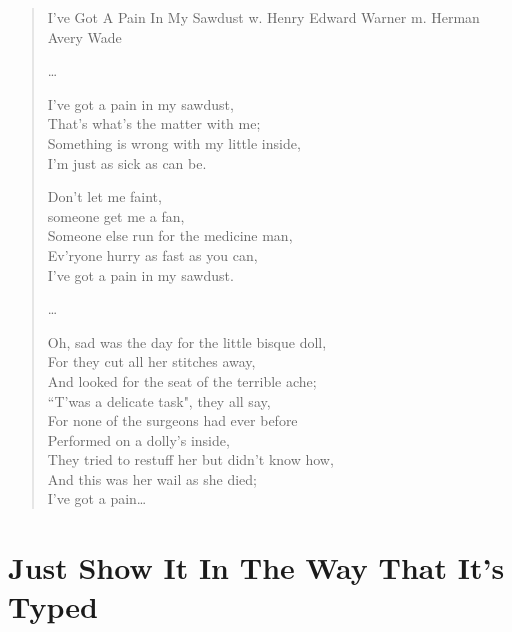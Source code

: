 \begin{verse}

\begin{center}

I've Got A Pain In My Sawdust
w. Henry Edward Warner m. Herman Avery Wade
\end{center}

\ldots

I've got a pain in my sawdust, \\

That's what's the matter with me;\\

Something is wrong with my little inside,\\

I'm just as sick as can be.

Don't let me faint, \\

someone get me a fan,\\

Someone else run for the medicine man,\\

Ev'ryone hurry as fast as you can,\\

I've got a pain in my sawdust.

\ldots

Oh, sad was the day for the little bisque doll,\\

For they cut all her stitches away,\\

And looked for the seat of the terrible ache;\\

``T'was a delicate task", they all say,\\

For none of the surgeons had ever before\\

Performed on a dolly's inside,\\

They tried to restuff her but didn't know how,\\

And this was her wail as she died;\\

I've got a pain\ldots
\end{verse}

\section{Just Show It In The Way That It's Typed}


